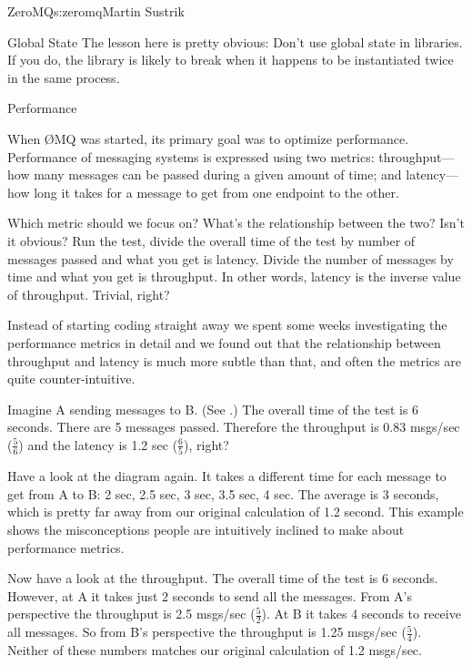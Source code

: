 \begin{aosachapter}{ZeroMQ}{s:zeromq}{Martin Sustrik}
\begin{aosasect1}{Global State}
The lesson here is pretty obvious: Don't use global state in
libraries. If you do, the library is likely to break when
it happens to be instantiated twice in the same process.

\end{aosasect1}

\begin{aosasect1}{Performance}

When {\O}MQ was started, its primary goal was to optimize performance.  
Performance of messaging systems is expressed using two metrics:
throughput---how many messages can be passed during a given amount
of time; and latency---how long it takes for a message to get from
one endpoint to the other.

Which metric should we focus on? What's the relationship between the
two?
Isn't it obvious? Run the test, divide the overall time of the test by
number of messages passed and what you get is latency. Divide the
number of messages by time and what you get is throughput. In other
words, latency is the inverse value of throughput. Trivial, right?

Instead of starting coding straight away we spent some weeks 
investigating the performance metrics in detail and we found out
that the relationship between throughput and latency is much more
subtle than that, and often the metrics are quite counter-intuitive.


Imagine A sending messages to B. (See .)  The
overall time of the test is 6 seconds. There are 5 messages
passed. Therefore the throughput is 0.83 msgs/sec ($\frac{5}{6}$) and 
the latency is 1.2 sec ($\frac{6}{5}$), right?

Have a look at the diagram again. It takes a different time for each
message to get from A to B: 2 sec, 2.5 sec, 3 sec, 3.5 sec, 4 sec. The
average is 3 seconds, which is pretty far away from our original
calculation of 1.2 second.  
This example shows the misconceptions people are intuitively
inclined to make about performance metrics.

Now have a look at the throughput. The overall time of the test is 6
seconds. However, at A it takes just 2 seconds to send all the
messages. From A's perspective the throughput is 2.5 msgs/sec
($\frac{5}{2}$). At B it takes 4 seconds to receive all messages. So from B's
perspective the throughput is 1.25 msgs/sec ($\frac{5}{4}$). Neither of these
numbers matches our original calculation of 1.2 msgs/sec.


\end{aosasect1}
\end{aosachapter}
